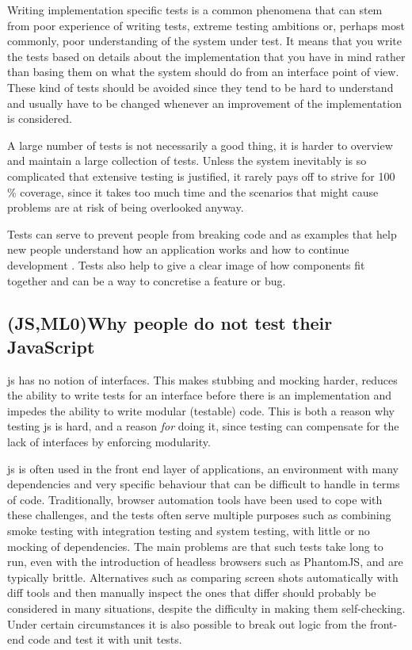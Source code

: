 \documentclass[11pt]{article}
\begin{document}
Writing implementation specific tests is a common phenomena that can stem from poor experience of writing tests, extreme testing ambitions or, perhaps most commonly, poor understanding of the system under test. It means that you write the tests based on details about the implementation that you have in mind rather than basing them on what the system should do from an interface point of view. These kind of tests should be avoided since they tend to be hard to understand and usually have to be changed whenever an improvement of the implementation is considered.

A large number of tests is not necessarily a good thing, it is harder to overview and maintain a large collection of tests. Unless the system inevitably is so complicated that extensive testing is justified, it rarely pays off to strive for 100 \% coverage, since it takes too much time and the scenarios that might cause problems are at risk of being overlooked anyway. \cite[question~28]{Edelstam}

Tests can serve to prevent people from breaking code and as examples that help new people understand how an application works and how to continue development \cite[questions~31-32]{Edelstam}. Tests also help to give a clear image of how components fit together and can be a way to concretise a feature or bug.

\subsection{(JS,ML0)Why people do not test their JavaScript}

\Gls{js} has no notion of interfaces. This makes stubbing and mocking harder, reduces the ability to write tests for an interface before there is an implementation and impedes the ability to write modular (testable) code. This is both a reason why testing \gls{js} is hard, and a reason \emph{for} doing it, since testing can compensate for the lack of interfaces by enforcing modularity.

\Gls{js} is often used in the front end layer of applications, an environment with many dependencies and very specific behaviour that can be difficult to handle in terms of code. Traditionally, browser automation tools have been used to cope with these challenges, and the tests often serve multiple purposes such as combining smoke testing with integration testing and system testing, with little or no mocking of dependencies. The main problems are that such tests take long to run, even with the introduction of headless browsers such as PhantomJS, and are typically brittle. Alternatives such as comparing screen shots automatically with diff tools and then manually inspect the ones that differ should probably be considered in many situations, despite the difficulty in making them self-checking. Under certain circumstances it is also possible to break out logic from the front-end code and test it with unit tests.
\end{document}
